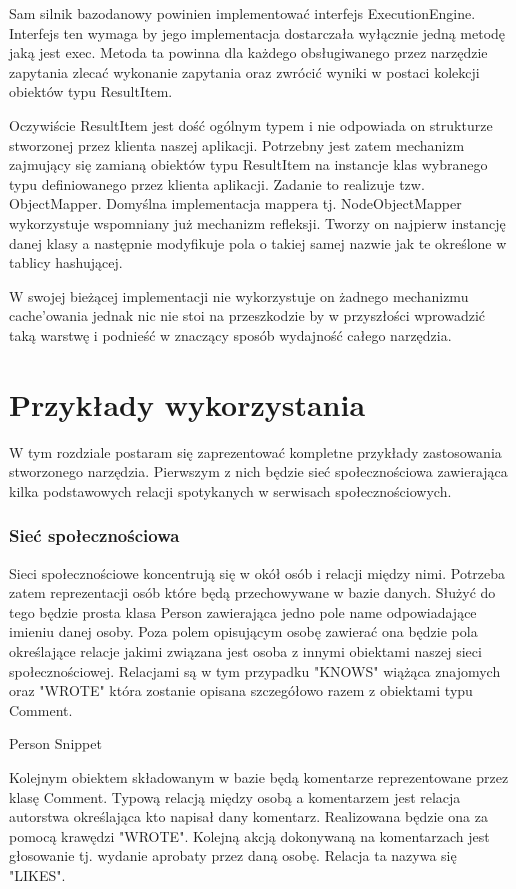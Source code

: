 \documentclass[brudnopis]{xmgr}
\begin{document}
Sam silnik bazodanowy powinien implementować interfejs ExecutionEngine. Interfejs ten wymaga by jego implementacja dostarczała wyłącznie jedną metodę jaką jest exec. Metoda ta powinna dla każdego obsługiwanego przez narzędzie zapytania zlecać wykonanie zapytania oraz zwrócić wyniki w postaci kolekcji obiektów typu ResultItem.

Oczywiście ResultItem jest dość ogólnym typem i nie odpowiada on strukturze stworzonej przez klienta naszej aplikacji. Potrzebny jest zatem mechanizm zajmujący się zamianą obiektów typu ResultItem na instancje klas wybranego typu definiowanego przez klienta aplikacji. Zadanie to realizuje tzw. ObjectMapper. Domyślna implementacja mappera tj. NodeObjectMapper wykorzystuje wspomniany już mechanizm refleksji. Tworzy on najpierw instancję danej klasy a następnie modyfikuje pola o takiej samej nazwie jak te określone w tablicy hashującej.

W swojej bieżącej implementacji nie wykorzystuje on żadnego mechanizmu cache'owania jednak nic nie stoi na przeszkodzie by w przyszłości wprowadzić taką warstwę i podnieść w znaczący sposób wydajność całego narzędzia.

\chapter{Przykłady wykorzystania}

W tym rozdziale postaram się zaprezentować kompletne przykłady zastosowania stworzonego narzędzia. Pierwszym z nich będzie sieć społecznościowa zawierająca kilka podstawowych relacji spotykanych w serwisach społecznościowych.

\subsection{Sieć społecznościowa}

Sieci społecznościowe koncentrują się w okół osób i relacji między nimi. Potrzeba zatem reprezentacji osób które będą przechowywane w bazie danych. Służyć do tego będzie prosta klasa Person zawierająca jedno pole name odpowiadające imieniu danej osoby. Poza polem opisującym osobę zawierać ona będzie pola określające relacje jakimi związana jest osoba z innymi obiektami naszej sieci społecznościowej. Relacjami są w tym przypadku "KNOWS" wiążąca znajomych oraz "WROTE" która zostanie opisana szczegółowo razem z obiektami typu Comment.

Person Snippet

Kolejnym obiektem składowanym w bazie będą komentarze reprezentowane przez klasę Comment. Typową relacją między osobą a komentarzem jest relacja autorstwa określająca kto napisał dany komentarz. Realizowana będzie ona za pomocą krawędzi "WROTE". Kolejną akcją dokonywaną na komentarzach jest głosowanie tj. wydanie aprobaty przez daną osobę. Relacja ta nazywa się "LIKES".
\end{document}
